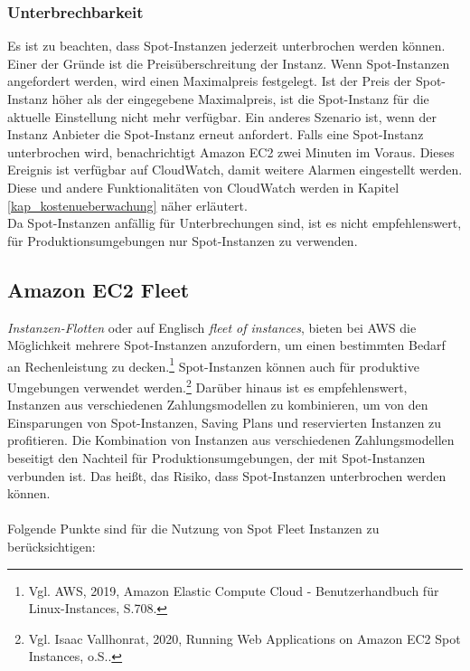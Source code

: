 \subsubsection*{Unterbrechbarkeit}
Es ist zu beachten, dass Spot-Instanzen jederzeit unterbrochen werden können. Einer der Gründe ist die Preisüberschreitung der Instanz. Wenn Spot-Instanzen angefordert werden, wird einen Maximalpreis festgelegt. Ist der Preis der Spot-Instanz höher als der eingegebene Maximalpreis, ist die Spot-Instanz für die aktuelle Einstellung nicht mehr verfügbar. Ein anderes Szenario ist, wenn der Instanz Anbieter die Spot-Instanz erneut anfordert. Falls eine Spot-Instanz unterbrochen wird, benachrichtigt Amazon EC2 zwei Minuten im Voraus. Dieses Ereignis ist verfügbar auf CloudWatch, damit weitere Alarmen eingestellt werden. Diese und andere Funktionalitäten von CloudWatch werden in Kapitel \ref{kap_kostenueberwachung} näher erläutert.
\\
Da Spot-Instanzen anfällig für Unterbrechungen sind, ist es nicht empfehlenswert, für Produktionsumgebungen nur Spot-Instanzen zu verwenden.


\subsection{Amazon EC2 Fleet} \label{sssec:AWS-EC2-Fleet}%
\textit{Instanzen-Flotten} oder auf Englisch \textit{fleet of instances}, bieten bei AWS die Möglichkeit mehrere Spot-Instanzen anzufordern, um einen bestimmten Bedarf an Rechenleistung zu decken.\footnote{Vgl. AWS, 2019, Amazon Elastic Compute Cloud - Benutzerhandbuch für Linux-Instances, S.708\cite{AMZ26}.} Spot-Instanzen können auch für produktive Umgebungen verwendet werden.\footnote{Vgl. Isaac Vallhonrat, 2020, Running Web Applications on Amazon EC2 Spot Instances, o.S.\cite{AMZ24}.} Darüber hinaus ist es empfehlenswert, Instanzen aus verschiedenen Zahlungsmodellen zu kombinieren, um von den Einsparungen von Spot-Instanzen, Saving Plans und reservierten Instanzen zu profitieren. Die Kombination von Instanzen aus verschiedenen Zahlungsmodellen beseitigt den Nachteil für Produktionsumgebungen, der mit Spot-Instanzen verbunden ist. Das heißt, das Risiko, dass Spot-Instanzen unterbrochen werden können.
\\\\
Folgende Punkte sind für die Nutzung von Spot Fleet Instanzen zu berücksichtigen:
